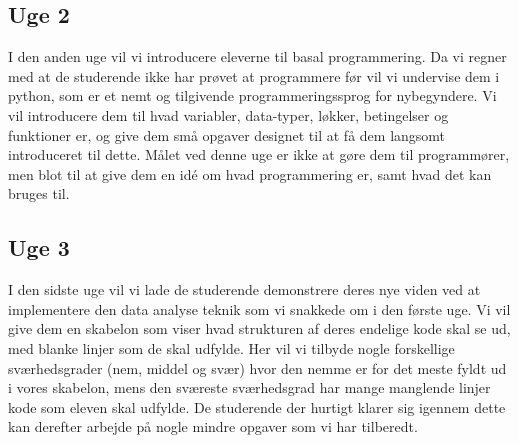 \documentclass[11pt]{article}
\begin{document}
    \subsection*{Uge 2}
        I den anden uge vil vi introducere eleverne til basal programmering. Da
        vi regner med at de studerende ikke har prøvet at programmere før
        vil vi undervise dem i python, som er et nemt og tilgivende
        programmeringssprog for nybegyndere. Vi vil introducere dem til hvad
        variabler, data-typer, løkker, betingelser og funktioner er, og give
        dem små opgaver designet til at få dem langsomt introduceret til
        dette. Målet ved denne uge er ikke at gøre dem til
        programmører, men blot til at give dem en idé om hvad programmering er,
        samt hvad det kan bruges til.

    \subsection*{Uge 3}
        I den sidste uge vil vi lade de studerende demonstrere deres nye viden
        ved at implementere den data analyse teknik som vi snakkede om i den
        første uge. Vi vil give dem en skabelon som viser hvad strukturen af
        deres endelige kode skal se ud, med blanke linjer som de skal udfylde.
        Her vil vi tilbyde nogle forskellige sværhedsgrader (nem, middel og svær)
        hvor den nemme er for det meste fyldt ud i vores skabelon, mens den
        sværeste sværhedsgrad har mange manglende linjer kode som eleven skal
        udfylde. De studerende der hurtigt klarer sig igennem dette kan derefter
        arbejde på nogle mindre opgaver som vi har tilberedt.
\end{document}
